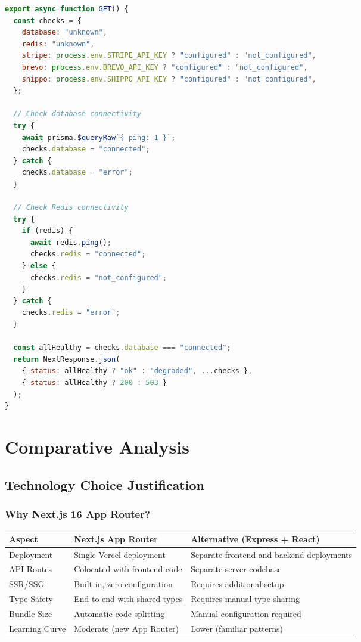 \documentclass[12pt,onecolumn]{IEEEtran}
\let\oldsection\section
\renewcommand{\section}{\clearpage\oldsection}
\begin{document}
\begin{lstlisting}[language=JavaScript,caption={Health check implementation}]
export async function GET() {
  const checks = {
    database: "unknown",
    redis: "unknown",
    stripe: process.env.STRIPE_API_KEY ? "configured" : "not_configured",
    brevo: process.env.BREVO_API_KEY ? "configured" : "not_configured",
    shippo: process.env.SHIPPO_API_KEY ? "configured" : "not_configured",
  };

  // Check database connectivity
  try {
    await prisma.$queryRaw`{ ping: 1 }`;
    checks.database = "connected";
  } catch {
    checks.database = "error";
  }

  // Check Redis connectivity
  try {
    if (redis) {
      await redis.ping();
      checks.redis = "connected";
    } else {
      checks.redis = "not_configured";
    }
  } catch {
    checks.redis = "error";
  }

  const allHealthy = checks.database === "connected";
  return NextResponse.json(
    { status: allHealthy ? "ok" : "degraded", ...checks },
    { status: allHealthy ? 200 : 503 }
  );
}
\end{lstlisting}



\section{Comparative Analysis}


\subsection{Technology Choice Justification}

\subsubsection{Why Next.js 16 App Router?}

\begin{center}
\begin{tabularx}{\textwidth}{lXX}
  \toprule
  \textbf{Aspect} & \textbf{Next.js App Router} & \textbf{Alternative (Express + React)} \\
  \midrule
  Deployment & Single Vercel deployment & Separate frontend and backend deployments \\
  API Routes & Colocated with frontend code & Separate server codebase \\
  SSR/SSG & Built-in, zero configuration & Requires additional setup \\
  Type Safety & End-to-end with shared types & Requires manual type sharing \\
  Bundle Size & Automatic code splitting & Manual configuration required \\
  Learning Curve & Moderate (new App Router) & Lower (familiar patterns) \\
  \bottomrule
\end{tabularx}
\end{center}
\end{document}
